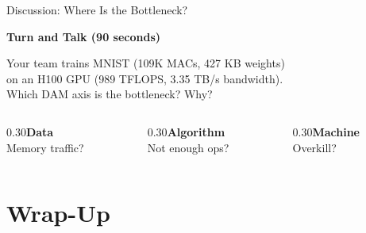 \documentclass[aspectratio=169, 12pt]{beamer}
\newcommand{\DAM}{D\raisebox{0.08em}{\tiny$\bullet$}A\raisebox{0.08em}{\tiny$\bullet$}M}
\begin{document}
\begin{frame}{Discussion: Where Is the Bottleneck?}

\centering
\vspace{0.8cm}
{\large\bfseries Turn and Talk \textcolor{midgray}{(90 seconds)}}

\vspace{0.6cm}
{\large Your team trains MNIST (109K MACs, 427 KB weights)\\
on an H100 GPU (989 TFLOPS, 3.35 TB/s bandwidth).\\[0.3cm]
\alert{Which \DAM{} axis is the bottleneck? Why?}}

\vspace{0.6cm}
\begin{columns}[c]
  \begin{column}{0.30\textwidth}\centering\small\textcolor{datastroke}{\textbf{Data}}\\{\footnotesize Memory traffic?}\end{column}
  \begin{column}{0.30\textwidth}\centering\small\textcolor{computestroke}{\textbf{Algorithm}}\\{\footnotesize Not enough ops?}\end{column}
  \begin{column}{0.30\textwidth}\centering\small\textcolor{routingstroke}{\textbf{Machine}}\\{\footnotesize Overkill?}\end{column}
\end{columns}

\end{frame}

\section{Wrap-Up}
\end{document}
